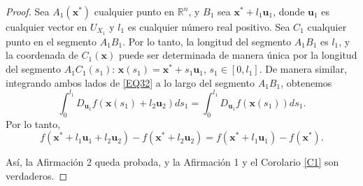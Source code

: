 \begin{proof}
Sea \( A_1 (\mathbf{x}^*) \) cualquier punto en \( \mathbb{R}^n \), y \( B_1 \) sea \( \mathbf{x}^* + l_1 \mathbf{u}_1 \), donde \( \mathbf{u}_1 \) es cualquier vector en \( U_{X_1} \) y \( l_1 \) es cualquier número real positivo. Sea \( C_1 \) cualquier punto en el segmento \( A_1 B_1 \). Por lo tanto, la longitud del segmento \( A_1 B_1 \) es \( l_1 \), y la coordenada de \( C_1 (\mathbf{x}) \) puede ser determinada de manera única por la longitud del segmento \( A_1 C_1 (s_1) \): \( \mathbf{x}(s_1) = \mathbf{x}^* + s_1 \mathbf{u}_1 \), \( s_1 \in [0, l_1] \). De manera similar, integrando ambos lados de \eqref{EQ32} a lo largo del segmento \( A_1 B_1 \), obtenemos
\begin{equation}
\int_0^{l_1} D_{\mathbf{u}_1} f(\mathbf{x}(s_1) + l_2 \mathbf{u}_2) ds_1 = \int_0^{l_1} D_{\mathbf{u}_1} f(\mathbf{x}(s_1)) ds_1.
\label{EQ33}
\end{equation}
Por lo tanto,
\begin{equation}
f(\mathbf{x}^* + l_1 \mathbf{u}_1 + l_2 \mathbf{u}_2) - f(\mathbf{x}^* + l_2 \mathbf{u}_2) = f(\mathbf{x}^* + l_1 \mathbf{u}_1) - f(\mathbf{x}^*).
\label{EQ34}
\end{equation}

Así, la Afirmación 2 queda probada, y la Afirmación 1 y el Corolario \ref{C1} son verdaderos.
\end{proof}




\endinput
